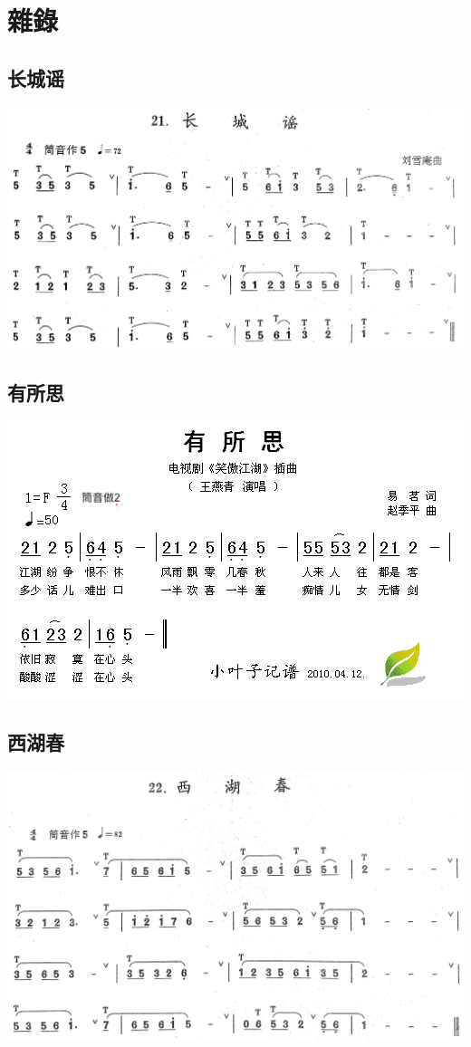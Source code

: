\documentclass[cn,pad,twocol]{elegantbook}
\begin{document}
\chapter{雜錄}
\section{长城谣}    \includegraphics[width=\textwidth]{dongxiao/20200711-长城谣.jpg}
\section{有所思}    \includegraphics[width=\textwidth]{dongxiao/20200710-有所思}
\section{西湖春}    \includegraphics[width=\textwidth]{dongxiao/20200711-西湖春.jpg}
\end{document}

